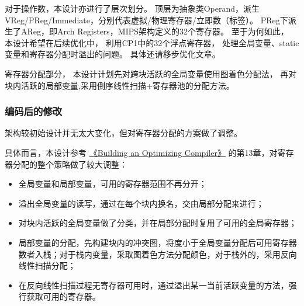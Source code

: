 对于操作数，本设计亦进行了层次划分。
顶层为抽象类Operand，派生VReg/PReg/Immediate，分别代表虚拟/物理寄存器/立即数（标签）。
PReg下派生了AReg，即Arch Registers，MIPS架构定义的32个寄存器。
至于为何如此，
本设计希望在后续优化中，
利用CP1中的32个浮点寄存器，
处理全局变量、static变量和寄存器分配时溢出的问题。
具体还请移步优化文章。

寄存器分配部分，
本设计计划先对跨块活跃的全局变量使用图着色分配法，
再对块内活跃的局部变量,采用倒序线性扫描+寄存器池的分配方法。

\subsubsection{编码后的修改}

架构较初始设计并无太大变化，但对寄存器分配的方案做了调整。

具体而言，本设计参考
\href{https://building-an-optimizing-compiler-zh-cn.readthedocs.io/zh-cn/latest/index.html}{《Building an Optimizing Compiler》}
的第13章，对寄存器分配的整个策略做了较大调整：

\begin{itemize}
    \item 全局变量和局部变量，可用的寄存器范围不再分开；
    \item 溢出全局变量的读写，通过在每个块内换名，交由局部分配来进行；
    \item 对块内活跃的全局变量做了分类，并在局部分配时复用了可用的全局寄存器；
    \item 局部变量的分配，先构建块内的冲突图，将度小于全局变量分配后可用寄存器数者入栈；对于栈内变量，采取图着色方法分配颜色，对于栈外的，采用反向线性扫描分配；
    \item 在反向线性扫描过程无寄存器可用时，通过溢出某一当前活跃变量的方法，强行获取可用的寄存器。
\end{itemize}